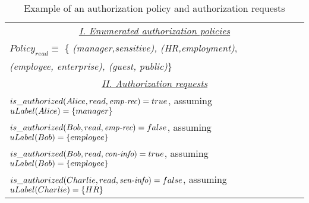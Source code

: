 \begin{table}[t]
\centering
\caption{Example of an authorization policy and authorization requests}
\label{tab:example-auth-policy}
\begin{tabular}{|l|}
	\hline
\multicolumn{1}{|c|}{\textit{\underline{I. Enumerated authorization policies}}} \\   
$Policy_{read} \equiv$ \{ \textit{(manager,sensitive), (HR,employment)}, \\ \hfill \textit{(employee, enterprise), (guest, public)}\}\\ \hline

\multicolumn{1}{|c|}{\textit{\underline{II. Authorization requests}}} \\   
$is\_authorized(Alice,read, \textit{emp-rec}) = true$, assuming $uLabel(Alice)=\{manager\}$\\
$is\_authorized(Bob,read, \textit{emp-rec}) = false$, assuming $uLabel(Bob)=\{employee\}$\\
$is\_authorized(Bob,read, \textit{con-info}) = true$, assuming $uLabel(Bob)=\{employee\}$\\
$is\_authorized(Charlie,read, \textit{sen-info}) = false$, assuming $uLabel(Charlie)=\{HR\}$\\
\hline
\end{tabular}
\end{table}


